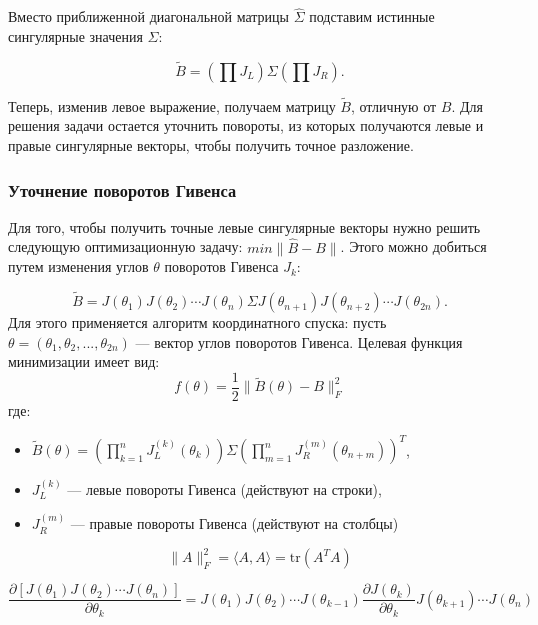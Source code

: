 Вместо приближенной диагональной матрицы \( \widehat{\Sigma} \) подставим истинные сингулярные значения \( \Sigma \):

\begin{equation}
\tilde{B} = \left( \prod J_L \right) \Sigma \left( \prod J_R \right).
\end{equation}

Теперь, изменив левое выражение, получаем матрицу $\tilde{B}$, отличную от $B$. Для решения задачи остается уточнить повороты, из которых получаются левые и правые сингулярные векторы, чтобы получить точное разложение.

\subsubsection{Уточнение поворотов Гивенса}

Для того, чтобы получить точные левые сингулярные векторы нужно решить следующую оптимизационную задачу: \(min\| \widehat{B} - B \|\). Этого можно добиться путем изменения углов \( \theta \) поворотов Гивенса \( J_k \):

\begin{equation} \label{b_hat}
\tilde{B} = J(\theta_1) J(\theta_2) \cdots J(\theta_n) \Sigma J(\theta_{n+1}) J(\theta_{n+2}) \cdots J(\theta_{2n}).
\end{equation}
Для этого применяется алгоритм координатного спуска: пусть $\theta = (\theta_1, \theta_2, ..., \theta_{2n})$ — вектор углов поворотов Гивенса. 
Целевая функция минимизации имеет вид:
\begin{equation}
f(\theta) = \frac{1}{2} \| \tilde{B}(\theta) - B \|_F^2
\end{equation}
где: 

\begin{itemize}
\item $\tilde{B}(\theta) = \left( \prod_{k=1}^n J_L^{(k)}(\theta_k) \right) \Sigma \left( \prod_{m=1}^n J_R^{(m)}(\theta_{n+m}) \right)^T$, 
\item $J_L^{(k)}$ — левые повороты Гивенса (действуют на строки), 
\item $J_R^{(m)}$ — правые повороты Гивенса (действуют на столбцы)
\end{itemize}

\begin{note}
\begin{equation}
    \|A\|_F^2 = \langle A, A\rangle = \text{tr}\left(A^TA\right)
\end{equation}
\end{note}
\begin{note}
\begin{equation} \label{j_diff}
    \frac{\partial [J(\theta_1) J(\theta_2) \cdots J(\theta_n)]}{\partial \theta_k} =
    J(\theta_1) J(\theta_2) \cdots  J(\theta_{k-1})\frac{\partial J(\theta_k)}{\partial \theta_k}J(\theta_{k+1}) \cdots J(\theta_n)
\end{equation}
\end{note}

